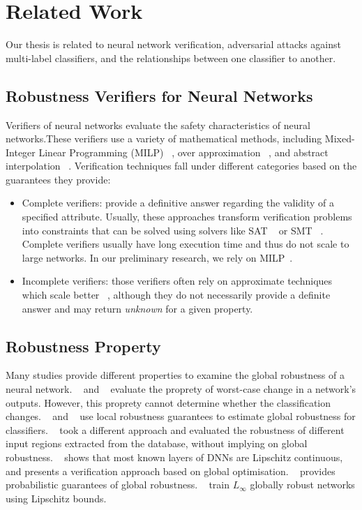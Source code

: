 
\section{Related Work}
Our thesis is related to neural network verification, adversarial attacks against multi-label classifiers, and the relationships between one classifier to another.

\subsection{Robustness Verifiers for Neural Networks}\label{subsec:verifiers}
Verifiers of neural networks evaluate the safety characteristics of neural networks.These verifiers use a variety of mathematical methods, including Mixed-Integer Linear Programming (MILP) ~\cite{singh2018robustness,lazarus2022mixed}, over approximation ~\cite{qin2019verification}, and abstract interpolation ~\cite{ABSTRACTINTER,INCOMPLETE1}. Verification techniques fall under different categories based on the guarantees they provide:
\begin{itemize}
    \item  Complete verifiers: provide a definitive answer regarding the validity of a specified attribute. Usually, these approaches transform verification problems into constraints that can be solved using solvers like SAT ~\cite{SATAPPROACH1,SATAPPROACH2} or SMT ~\cite{NNTOBINARCONSTRAINS,PLANET,Reluplex}. Complete verifiers usually have long execution time and thus do not scale to large networks.
        In our preliminary research, we rely on MILP~\cite{MIPVERIFY}.
    \item Incomplete verifiers: those verifiers often rely on approximate techniques which scale better ~\cite{INCOMPLETE1,INCOMPLETE2}, although they do not necessarily provide a definite answer and may return \emph{unknown} for a given property. 
\end{itemize}

\subsection{Robustness Property}
Many studies provide different properties to examine the global robustness of a neural network.
~\cite{Reluplex} and ~\cite{EFCIENTGLOBALROBU} evaluate the proprety of worst-case change in a network’s outputs. However, this proprety cannot determine whether the classification changes. ~\cite{MEASURENNROBCON} and ~\cite{GLOBALPROPERTY} use local robustness guarantees to estimate global robustness for classifiers. ~\cite{ROBUSTFROMDATASET} took a different approach and evaluated the robustness of different input regions extracted from the database, without implying on global robustness. ~\cite{ANOTHERGLOBALPROPERTY} shows that most known layers of DNNs are Lipschitz continuous, and presents a verification approach based on global optimisation. ~\cite{GROMA} provides probabilistic guarantees of global robustness. ~\cite{RETHINKLIP} train \( L_\infty \) globally robust networks using Lipschitz bounds.

